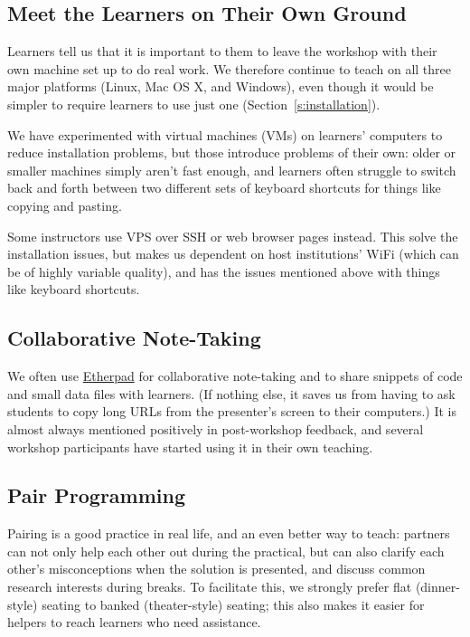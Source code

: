 \documentclass[10pt,a4paper,twocolumn]{article}
\begin{document}
\subsection{Meet the Learners on Their Own Ground}

Learners tell us that it is important to them to leave the workshop
with their own machine set up to do real work.  We therefore continue
to teach on all three major platforms (Linux, Mac OS X, and Windows),
even though it would be simpler to require learners to use just one
(Section~\ref{s:installation}).

We have experimented with virtual machines (VMs) on learners'
computers to reduce installation problems, but those introduce
problems of their own: older or smaller machines simply aren't fast
enough, and learners often struggle to switch back and forth between
two different sets of keyboard shortcuts for things like copying and
pasting.

Some instructors use VPS over SSH or web browser pages instead.  This
solve the installation issues, but makes us dependent on host
institutions' WiFi (which can be of highly variable quality), and
has the issues mentioned above with things like keyboard shortcuts.

\subsection{Collaborative Note-Taking}\label{s:etherpad}

We often use \href{http://etherpad.org}{Etherpad} for collaborative
note-taking and to share snippets of code and small data files with
learners. (If nothing else, it saves us from having to ask students to
copy long URLs from the presenter's screen to their computers.) It is
almost always mentioned positively in post-workshop feedback, and
several workshop participants have started using it in their own
teaching.

\subsection{Pair Programming}

Pairing is a good practice in real life, and an even better way to
teach: partners can not only help each other out during the practical,
but can also clarify each other's misconceptions when the solution is
presented, and discuss common research interests during breaks. To
facilitate this, we strongly prefer flat (dinner-style) seating to
banked (theater-style) seating; this also makes it easier for helpers
to reach learners who need assistance.
\end{document}

